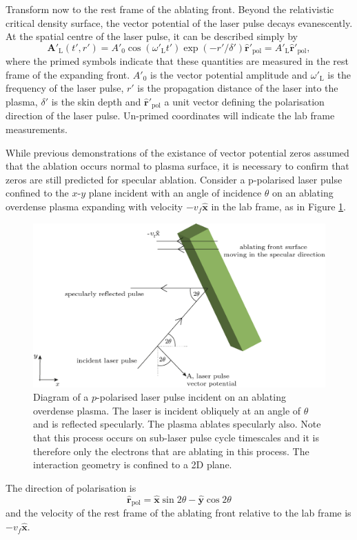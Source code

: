 Transform now to the rest frame of the ablating front. Beyond the relativistic critical density surface, the vector potential of the laser pulse decays evanescently. At the spatial centre of the laser pulse, it can be described simply by
\begin{equation}
	\mathbf{A}'_\mathrm{L}(t',r') = A'_0\cos(\omega'_\mathrm{L}t')\exp(-r'/\delta')\hat{\mathbf{r}}'_\mathrm{pol}= A'_\mathrm{L}\hat{\mathbf{r}}'_\mathrm{pol},
\end{equation}
where the primed symbols indicate that these quantities are measured in the rest frame of the expanding front. $A'_0$ is the vector potential amplitude and $\omega'_\mathrm{L}$ is the frequency of the laser pulse, $r'$ is the propagation distance of the laser into the plasma, $\delta'$ is the skin depth and $\hat{\mathbf{r}}'_\mathrm{pol}$ a unit vector defining the polarisation direction of the laser pulse. Un-primed coordinates will indicate the lab frame measurements.


While previous demonstrations of the existance of vector potential zeros assumed that the ablation occurs normal to plasma surface, it is necessary to confirm that zeros are still predicted for specular ablation. Consider a p-polarised laser pulse confined to the $x$-$y$ plane incident with an angle of incidence $\theta$ on an ablating overdense plasma expanding with velocity $-v_f\hat{\mathbf{x}}$ in the lab frame, as in Figure \ref{fig:zvp_ablatingfront}.

\begin{figure}
	\centering
	\includegraphics[width=0.7\linewidth]{figures/zvp/zvp_ablating_front}
	\caption[Diagram of a $p$-polarised laser pulse incident on an ablating overdense plasma.]{Diagram of a $p$-polarised laser pulse incident on an ablating overdense plasma. The laser is incident obliquely at an angle of $\theta$ and is reflected specularly. The plasma ablates specularly also. Note that this process occurs on sub-laser pulse cycle timescales and it is therefore only the electrons that are ablating in this process. The interaction geometry is confined to a 2D plane.}
	\label{fig:zvp_ablatingfront}
\end{figure}
The direction of polarisation is
\begin{equation}
	\hat{\mathbf{r}}_\mathrm{pol} = \hat{\mathbf{x}}\sin{2\theta} - \hat{\mathbf{y}}\cos{2\theta}
\end{equation}
and the velocity of the rest frame of the ablating front relative to the lab frame is $-v_f\hat{\mathbf{x}}$.

